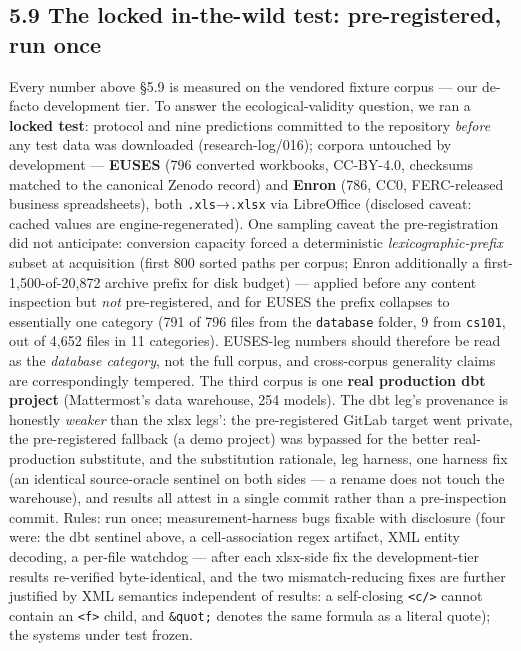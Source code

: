 \documentclass[
  11pt,
]{article}
\begin{document}
\subsection{5.9 The locked in-the-wild test: pre-registered, run
once}\label{the-locked-in-the-wild-test-pre-registered-run-once}

Every number above §5.9 is measured on the vendored fixture corpus ---
our de-facto development tier. To answer the ecological-validity
question, we ran a \textbf{locked test}: protocol and nine predictions
committed to the repository \emph{before} any test data was downloaded
(research-log/016); corpora untouched by development --- \textbf{EUSES}
(796 converted workbooks, CC-BY-4.0, checksums matched to the canonical
Zenodo record) and \textbf{Enron} (786, CC0, FERC-released business
spreadsheets), both \texttt{.xls}→\texttt{.xlsx} via LibreOffice
(disclosed caveat: cached values are engine-regenerated). One sampling
caveat the pre-registration did not anticipate: conversion capacity
forced a deterministic \emph{lexicographic-prefix} subset at acquisition
(first 800 sorted paths per corpus; Enron additionally a
first-1,500-of-20,872 archive prefix for disk budget) --- applied before
any content inspection but \emph{not} pre-registered, and for EUSES the
prefix collapses to essentially one category (791 of 796 files from the
\texttt{database} folder, 9 from \texttt{cs101}, out of 4,652 files in
11 categories). EUSES-leg numbers should therefore be read as the
\emph{database category}, not the full corpus, and cross-corpus
generality claims are correspondingly tempered. The third corpus is one
\textbf{real production dbt project} (Mattermost's data warehouse, 254
models). The dbt leg's provenance is honestly \emph{weaker} than the
xlsx legs': the pre-registered GitLab target went private, the
pre-registered fallback (a demo project) was bypassed for the better
real-production substitute, and the substitution rationale, leg harness,
one harness fix (an identical source-oracle sentinel on both sides --- a
rename does not touch the warehouse), and results all attest in a single
commit rather than a pre-inspection commit. Rules: run once;
measurement-harness bugs fixable with disclosure (four were: the dbt
sentinel above, a cell-association regex artifact, XML entity decoding,
a per-file watchdog --- after each xlsx-side fix the development-tier
results re-verified byte-identical, and the two mismatch-reducing fixes
are further justified by XML semantics independent of results: a
self-closing \texttt{\textless{}c/\textgreater{}} cannot contain an
\texttt{\textless{}f\textgreater{}} child, and \texttt{\&quot;} denotes
the same formula as a literal quote); the systems under test frozen.
\end{document}
